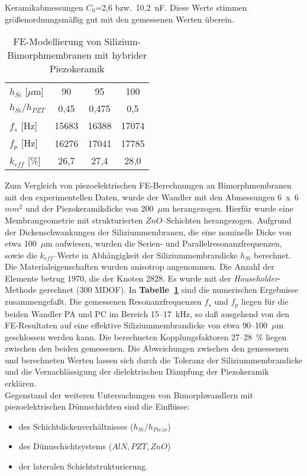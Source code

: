 Keramikabmessungen $C_{0}$=2,6 bzw.\ 10,2~nF. Diese Werte stimmen
größenordnungsmäßig gut mit den gemessenen Werten überein.\\
%
%
\begin{table}[htb]
\caption{\label{tabpiezosim}
 FE-Modellierung von Silizium-Bimorphmembranen mit hybrider Piezokeramik}
\begin{center}
\begin{tabular} {|l||c|c|c|}
\hline
 $h_{Si}$ [$\mu$m]  & 90   & 95    & 100  \\
 $h_{Si}/h_{PZT}$   & 0,45 & 0,475 & 0,5  \\
\hline \hline
 $f_{s}$ [Hz]       & 15683 & 16388 & 17074  \\
 $f_{p}$ [Hz]       & 16276 & 17041 & 17785  \\
\hline
 $k_{eff}$ [\%]     & 26,7 & 27,4 & 28,0 \\
\hline
\end{tabular}
\end{center}
\end{table}
Zum Vergleich von piezoelektrischen FE-Berechnungen an Bimorphmembranen
mit den experimentellen Daten, wurde der Wandler mit den Abmessungen
6~x~6~$mm^{2}$ und der Piezokeramikdicke von 200~$\mu$m herangezogen.
Hierfür wurde eine Membrangeometrie mit strukturierten $ZnO$--Schichten
herangezogen. %
Aufgrund der Dickenschwankungen der
Siliziummembranen, die eine nominelle Dicke von etwa 100~$\mu$m aufwiesen,
wurden die Serien- und Parallelresonanzfrequenzen, sowie die
$k_{eff}$--Werte in Abhängigkeit der Siliziummembrandicke $h_{Si}$
berechnet. Die Materialeigenschaften wurden anisotrop angenommen. Die
Anzahl der Elemente betrug 1970, die der Knoten 2828. Es wurde mit der
{\sl Householder}-Methode gerechnet (300 MDOF).
In {\bf Tabelle~\ref{tabpiezosim}} sind die numerischen Ergebnisse
zusammengefaßt. Die gemessenen Resonanzfrequenzen $f_{s}$ und $f_{p}$ liegen
für die beiden Wandler PA und PC im Bereich 15--17~kHz, so daß ausgehend
von den FE-Resultaten auf eine effektive Siliziummembrandicke von etwa
90--100~$\mu$m geschlossen werden kann. Die berechneten Kopplungsfaktoren
27--28~\% liegen zwischen den beiden gemessenen. Die Abweichungen zwischen
den gemessenen und berechneten Werten lassen sich durch die Toleranz der
Siliziummembrandicke und die Vernachlässigung der dielektrischen Dämpfung
der Piezokeramik erklären.\\
%
Gegenstand der weiteren Untersuchungen von Bimorphwandlern mit
piezoelektrischen Dünnschichten sind die Einflüsse:
\begin{itemize}
\item des Schichtdickenverhältnisses ($h_{Si}/h_{Piezo}$)
\item des Dünnschichtsystems ($AlN, PZT, ZnO$)
\item der lateralen Schichtstrukturierung.
\end{itemize}



